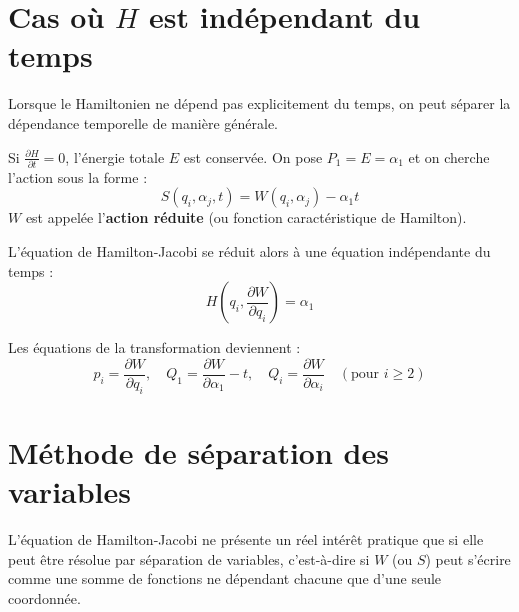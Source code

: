 \documentclass[french]{yLectureNote}
\begin{document}
\section{Cas où $H$ est indépendant du temps}

Lorsque le Hamiltonien ne dépend pas explicitement du temps, on peut séparer la dépendance temporelle de manière générale.

\begin{definition}
Si $\frac{\partial H}{\partial t} = 0$, l'énergie totale $E$ est conservée. On pose $P_1 = E = \alpha_1$ et on cherche l'action sous la forme :
\begin{equation}
    S(q_i, \alpha_j, t) = W(q_i, \alpha_j) - \alpha_1 t
\end{equation}
$W$ est appelée l'\textbf{action réduite} (ou fonction caractéristique de Hamilton).
\end{definition}

L'équation de Hamilton-Jacobi se réduit alors à une équation indépendante du temps :
\begin{equation}
    H\left(q_i, \frac{\partial W}{\partial q_i}\right) = \alpha_1
\end{equation}

Les équations de la transformation deviennent :
\begin{equation}
    p_i = \frac{\partial W}{\partial q_i}, \quad Q_1 = \frac{\partial W}{\partial \alpha_1} - t, \quad Q_i = \frac{\partial W}{\partial \alpha_i} \quad (\text{pour } i \ge 2)
\end{equation}




\section{Méthode de séparation des variables}

L'équation de Hamilton-Jacobi ne présente un réel intérêt pratique que si elle peut être résolue par séparation de variables, c'est-à-dire si $W$ (ou $S$) peut s'écrire comme une somme de fonctions ne dépendant chacune que d'une seule coordonnée.
\end{document}

